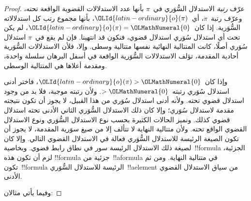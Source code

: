 \documentclass[../../../include/open-logic-section]{subfiles}
\begin{document}
\begin{proof}
  عرّف \emph{رتبة} الاستدلال السُّوَري في~$\pi$ بأنها عدد الاستدلالات
  القضوية الواقعة تحته، وعرّف رتبة~$\pi$، أي~$\OLId{latin-ordinary}{o}(\pi)$، بأنها مجموع رتب
  كل استدلالاته السُّوَرية. إذا كان~$\OLId{latin-ordinary}{o}(\pi)=\OLMathNumeral{0}$، لم يكن تحت أي استدلال
  سُوَري استدلال قضوي، فنكون قد انتهينا. فإن لم يقع في~$\pi$ استدلال
  سُوَري أصلًا، كانت المتتالية النهائية نفسها متتالية وسطى. وإلا، فلأن
  الاستدلالات السُّوَرية أحادية المقدمة، تؤلف الاستدلالات السُّوَرية
  الواقعة في أسفل البرهان سلسلة واحدة، ومقدمة أعلاها هي المتتالية الوسطى.

  وإذا كان~$\OLId{latin-ordinary}{o}(\pi)>\OLMathNumeral{0}$، فاختر أدنى استدلال سُوَري رتبته~$>\OLMathNumeral{0}$. ولأن
  رتبته موجبة، فلا بد من وجود استدلال قضوي تحته. ولأنه أدنى استدلال
  سُوَري من هذا القبيل، لا يجوز أن تكون نتيجته مقدمة لاستدلال سُوَري؛
  وإلا كان ذلك الاستدلال السُّوَري الثاني الأدنى تحته استدلال قضوي
  كذلك. ونميز الحالات الكثيرة بحسب نوع الاستدلال السُّوَري ونوع
  الاستدلال القضوي الواقع تحته. ولأن متتالية النهاية لا تتألف إلا من
  صيغ سوَرية المقدمة، لا يجوز أن تكون الصيغة الرئيسة للاستدلال السُّوَري
  فعالة في الاستدلال القضوي التالي. وإلا كان لصيغة ذلك الاستدلال الرئيسة
  سور في نطاق رابط قضوي. وبخاصية~!!{formula} الجزئية، لزم أن تكون هذه
  !!{formula} جزئية من~!!a{formula} في متتالية النهاية. ومن ثم
  تكون~!!{formula} الرئيسة للاستدلال السُّوَري~!!a{element} من سياق
  الاستدلال القضوي الأدنى.

  وفيما يأتي مثالان:


\end{proof}
\end{document}

